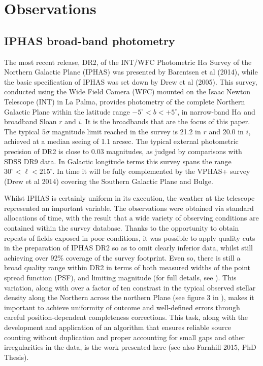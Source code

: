 \documentclass[a4paper,useAMS,usenatbib]{mn2e}
\begin{document}
\section[]{Observations}

\subsection{IPHAS broad-band photometry}

The most recent release, DR2, of the INT/WFC Photometric H$\alpha$ Survey of the Northern Galactic Plane (IPHAS) was 
presented by Barentsen et al (2014), while the basic specification of IPHAS was set down by Drew et al (2005).  This 
survey, conducted using the Wide Field Camera (WFC) mounted on the Isaac Newton Telescope (INT) in La Palma, provides 
photometry of the complete Northern Galactic Plane within the latitude range $-5^{\circ} < b < +5^{\circ}$, in narrow-band 
H$\alpha$ and broadband Sloan $r$ and $i$.  It is the broadbands that are the focus of this paper.  The typical 
$5\sigma$ magnitude limit reached in the survey is 21.2 in $r$ and 20.0 in $i$, achieved at a median seeing of 1.1 arcsec.  
The typical external photometric precision of DR2 is close to 0.03 magnitudes, as judged by comparisons with SDSS DR9 
data.  In Galactic longitude terms this survey spans the range $30^{\circ} < \ell < 215^{\circ}$.  In time it will be 
fully complemented by the VPHAS+ survey (Drew et al 2014) covering the Southern Galactic Plane and Bulge.  

Whilst IPHAS is certainly uniform in its execution, the weather at the telescope represented an important variable.  The 
observations were obtained via standard allocations of time, with the result that a wide variety of observing conditions 
are contained within the survey database.  Thanks to the opportunity to obtain repeats of fields exposed in poor conditions, 
it was possible to apply quality cuts in the preparation of IPHAS DR2 so as to omit clearly inferior data, whilst still 
achieving over 92\% coverage of the survey footprint.  Even so, there is still a broad quality range within DR2 in terms 
of both measured widths of the point spread function (PSF), and limiting magnitude (for full details, 
see \citet{Barentsen2014}).  This variation, along with over a factor of ten constrast in the typical observed stellar density along the Northern 
across the northern Plane (see figure 3 in \citet{Gonzalez-Solares2008}), makes it important to 
achieve uniformity of outcome and well-defined errors through careful position-dependent completeness corrections. 
This task, along with the development and application of an algorithm that ensures reliable source 
counting without duplication and proper accounting for small gaps and other irregularities in the data, is the work 
presented here (see also Farnhill 2015, PhD Thesis).
\end{document}
